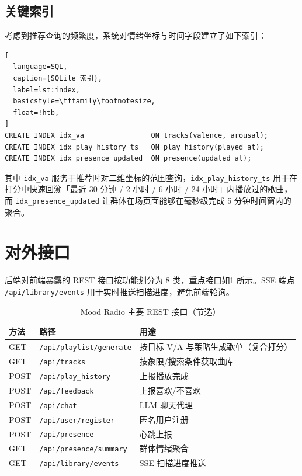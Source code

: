 \subsection{关键索引}

考虑到推荐查询的频繁度，系统对情绪坐标与时间字段建立了如下索引：

\begin{lstlisting}[
  language=SQL,
  caption={SQLite 索引},
  label=lst:index,
  basicstyle=\ttfamily\footnotesize,
  float=!htb,
]
CREATE INDEX idx_va                ON tracks(valence, arousal);
CREATE INDEX idx_play_history_ts   ON play_history(played_at);
CREATE INDEX idx_presence_updated  ON presence(updated_at);
\end{lstlisting}

其中 \texttt{idx\_va} 服务于推荐时对二维坐标的范围查询，\texttt{idx\_play\_history\_ts} 用于在打分中快速回溯「最近 30 分钟 / 2 小时 / 6 小时 / 24 小时」内播放过的歌曲，而 \texttt{idx\_presence\_updated} 让群体在场页面能够在毫秒级完成 5 分钟时间窗内的聚合。

\section{对外接口}

后端对前端暴露的 REST 接口按功能划分为 8 类，重点接口如\cref{tab:api} 所示。SSE 端点 \texttt{/api/library/events} 用于实时推送扫描进度，避免前端轮询。

\begin{table}[!htb]
  \centering
  \caption{Mood Radio 主要 REST 接口（节选）}\label{tab:api}
  \begin{tabularx}{\linewidth}{llX}
    \toprule
    \textbf{方法} & \textbf{路径} & \textbf{用途} \\
    \midrule
    GET  & \texttt{/api/playlist/generate} & 按目标 V/A 与策略生成歌单（复合打分） \\
    GET  & \texttt{/api/tracks}            & 按象限/搜索条件获取曲库 \\
    POST & \texttt{/api/play\_history}     & 上报播放完成 \\
    POST & \texttt{/api/feedback}          & 上报喜欢/不喜欢 \\
    POST & \texttt{/api/chat}              & LLM 聊天代理 \\
    POST & \texttt{/api/user/register}     & 匿名用户注册 \\
    POST & \texttt{/api/presence}          & 心跳上报 \\
    GET  & \texttt{/api/presence/summary}  & 群体情绪聚合 \\
    GET  & \texttt{/api/library/events}    & SSE 扫描进度推送 \\
    \bottomrule
  \end{tabularx}
\end{table}
